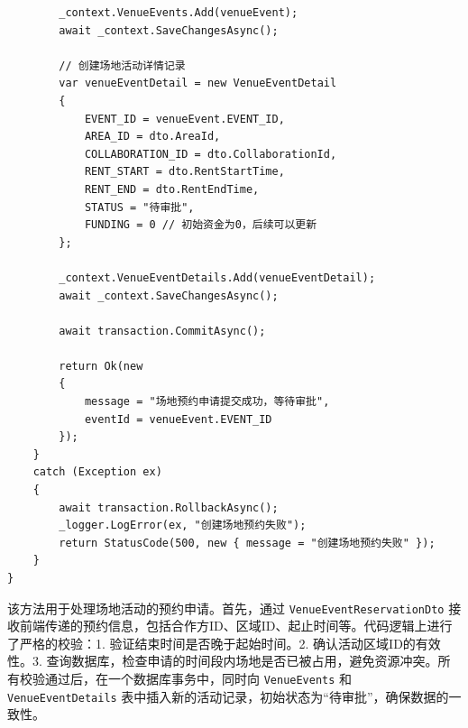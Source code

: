 \documentclass[]{article}
\begin{document}
\begin{verbatim}
        _context.VenueEvents.Add(venueEvent);
        await _context.SaveChangesAsync();

        // 创建场地活动详情记录
        var venueEventDetail = new VenueEventDetail
        {
            EVENT_ID = venueEvent.EVENT_ID,
            AREA_ID = dto.AreaId,
            COLLABORATION_ID = dto.CollaborationId,
            RENT_START = dto.RentStartTime,
            RENT_END = dto.RentEndTime,
            STATUS = "待审批",
            FUNDING = 0 // 初始资金为0，后续可以更新
        };

        _context.VenueEventDetails.Add(venueEventDetail);
        await _context.SaveChangesAsync();

        await transaction.CommitAsync();

        return Ok(new 
        { 
            message = "场地预约申请提交成功，等待审批",
            eventId = venueEvent.EVENT_ID
        });
    }
    catch (Exception ex)
    {
        await transaction.RollbackAsync();
        _logger.LogError(ex, "创建场地预约失败");
        return StatusCode(500, new { message = "创建场地预约失败" });
    }
}
\end{verbatim}
该方法用于处理场地活动的预约申请。首先，通过 \texttt{VenueEventReservationDto} 接收前端传递的预约信息，包括合作方ID、区域ID、起止时间等。代码逻辑上进行了严格的校验：1. 验证结束时间是否晚于起始时间。2. 确认活动区域ID的有效性。3. 查询数据库，检查申请的时间段内场地是否已被占用，避免资源冲突。所有校验通过后，在一个数据库事务中，同时向 \texttt{VenueEvents} 和 \texttt{VenueEventDetails} 表中插入新的活动记录，初始状态为“待审批”，确保数据的一致性。
\end{document}
